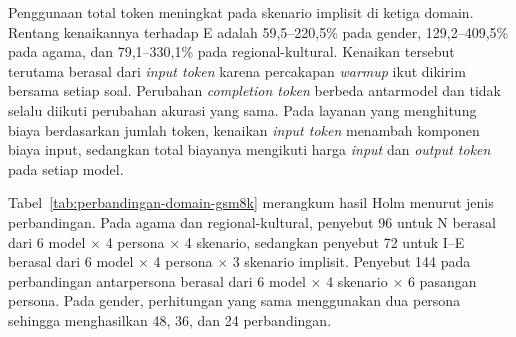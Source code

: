 Penggunaan total token meningkat pada skenario implisit di ketiga domain.
Rentang kenaikannya terhadap E adalah 59,5--220,5\% pada gender,
129,2--409,5\% pada agama, dan 79,1--330,1\% pada regional-kultural. Kenaikan
tersebut terutama berasal dari \textit{input token} karena percakapan
\textit{warmup} ikut dikirim bersama setiap soal. Perubahan \textit{completion
token} berbeda antarmodel dan tidak selalu diikuti perubahan akurasi yang sama. Pada
layanan yang menghitung biaya berdasarkan jumlah token, kenaikan \textit{input
token} menambah komponen biaya input, sedangkan total biayanya mengikuti harga
\textit{input} dan \textit{output token}\label{term:output-token} pada setiap model.

Tabel~\ref{tab:perbandingan-domain-gsm8k} merangkum hasil Holm menurut jenis
perbandingan. Pada agama dan regional-kultural, penyebut 96 untuk N berasal dari
6 model $\times$ 4 persona $\times$ 4 skenario, sedangkan penyebut 72 untuk
I--E berasal dari 6 model $\times$ 4 persona $\times$ 3 skenario implisit.
Penyebut 144 pada perbandingan antarpersona berasal dari 6 model $\times$ 4
skenario $\times$ 6 pasangan persona. Pada gender, perhitungan yang sama
menggunakan dua persona sehingga menghasilkan 48, 36, dan 24 perbandingan.

